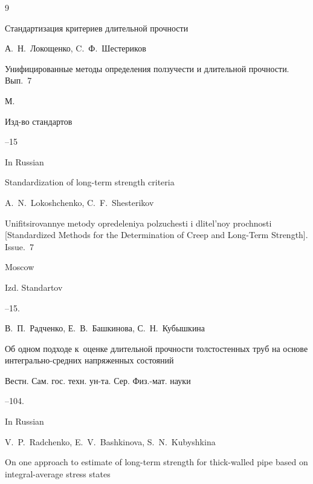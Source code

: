 \begin{thebibliography}{9}

\paper Стандартизация критериев длительной прочности

\by А.~Н.~Локощенко, C.~Ф.~Шестериков

\inbook Унифицированные методы определения ползучести и длительной прочности. \rm Вып.~7

\publaddr М. 

\publ Изд-во стандартов 


--15

\misctransl

\lang In Russian

\paper Standardization of long-term strength criteria

\by A.~N.~Lokoshchenko, C.~F.~Shesterikov

\inbook Unifitsirovannye metody opredeleniya polzuchesti i dlitel'noy prochnosti \rm [Standardized Methods for the Determination of Creep and Long-Term Strength]. Issue.~7

\publaddr Moscow

\publ Izd. Standartov


--15.












\by В.~П.~Радченко, Е.~В.~Башкинова, С.~Н.~Кубышкина

\paper Об одном подходе к~оценке длительной прочности толстостенных труб на основе интегрально-средних напряженных состояний

\jour Вестн. Сам. гос. техн. ун-та. Сер. Физ.-мат. науки



--104.



\misctransl

\lang In Russian

\by V.~P.~Radchenko, E.~V.~Bashkinova, S.~N.~Kubyshkina

\paper On one approach to estimate of  long-term strength for thick-walled pipe based on integral-average stress states


\end{thebibliography}
